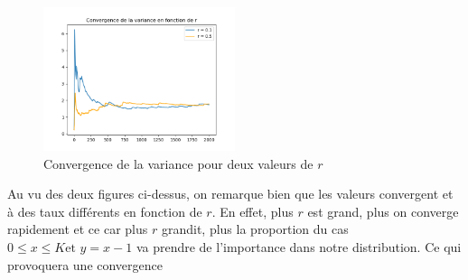 \begin{figure}[H]
  \centering
  \includegraphics[width=0.5\textwidth]{figs/convergence_var.png}
  \caption{Convergence de la variance pour deux valeurs de $r$}
\end{figure}

Au vu des deux figures ci-dessus, on remarque bien que les valeurs convergent et à des taux différents en fonction de $r$. En effet, plus $r$ est grand, plus on converge rapidement et ce car 
plus $r$ grandit, plus la proportion du cas $0 \leq x \leq K \text{et } y = x-1$ va prendre de l'importance dans notre distribution. Ce qui provoquera une convergence 

\subsubsection{}